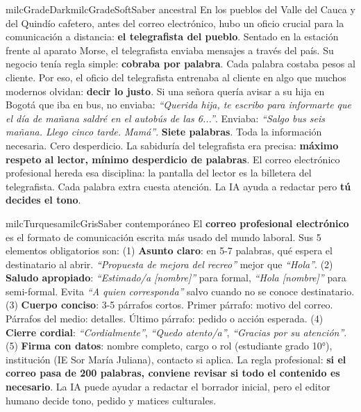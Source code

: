 \documentclass[11pt,letterpaper]{article}
\begin{document}
\begin{softbox}{milcGradeDark}{milcGradeSoft}{Saber ancestral}
En los pueblos del Valle del Cauca y del Quindío cafetero, antes del correo electrónico, hubo un oficio crucial para la comunicación a distancia: \textbf{el telegrafista del pueblo}. Sentado en la estación frente al aparato Morse, el telegrafista enviaba mensajes a través del país. Su negocio tenía regla simple: \textbf{cobraba por palabra}. Cada palabra costaba pesos al cliente. Por eso, el oficio del telegrafista entrenaba al cliente en algo que muchos modernos olvidan: \textbf{decir lo justo}. Si una señora quería avisar a su hija en Bogotá que iba en bus, no enviaba: \emph{``Querida hija, te escribo para informarte que el día de mañana saldré en el autobús de las 6...''}. Enviaba: \emph{``Salgo bus seis mañana. Llego cinco tarde. Mamá''}. \textbf{Siete palabras}. Toda la información necesaria. Cero desperdicio. La sabiduría del telegrafista era precisa: \textbf{máximo respeto al lector, mínimo desperdicio de palabras}. El correo electrónico profesional hereda esa disciplina: la pantalla del lector es la billetera del telegrafista. Cada palabra extra cuesta atención. La IA ayuda a redactar pero \textbf{tú decides el tono}.
\end{softbox}

\begin{softbox}{milcTurquesa}{milcGris}{Saber contemporáneo}
El \textbf{correo profesional electrónico} es el formato de comunicación escrita más usado del mundo laboral. Sus 5 elementos obligatorios son: (1) \textbf{Asunto claro}: en 5-7 palabras, qué espera el destinatario al abrir. \emph{``Propuesta de mejora del recreo''} mejor que \emph{``Hola''}. (2) \textbf{Saludo apropiado}: \emph{``Estimado/a [nombre]''} para formal, \emph{``Hola [nombre]''} para semi-formal. Evita \emph{``A quien corresponda''} salvo cuando no se conoce destinatario. (3) \textbf{Cuerpo conciso}: 3-5 párrafos cortos. Primer párrafo: motivo del correo. Párrafos del medio: detalles. Último párrafo: pedido o acción esperada. (4) \textbf{Cierre cordial}: \emph{``Cordialmente''}, \emph{``Quedo atento/a''}, \emph{``Gracias por su atención''}. (5) \textbf{Firma con datos}: nombre completo, cargo o rol (estudiante grado 10°), institución (IE Sor María Juliana), contacto si aplica. La regla profesional: \textbf{si el correo pasa de 200 palabras, conviene revisar si todo el contenido es necesario}. La IA puede ayudar a redactar el borrador inicial, pero el editor humano decide tono, pedido y matices culturales.
\end{softbox}
\end{document}
